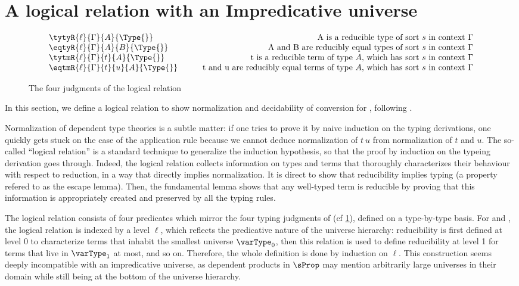 \section{A logical relation with an Impredicative universe}
\label{sec:logic-relat-with}

\begin{figure}
    \[
  \begin{array}{lr}
    \tytyR{\ell}{\Gamma}{A}{\Type{}} & \text{A is a reducible type of sort \( s \) in context \( \Gamma \)} \\
    \eqtyR{\ell}{\Gamma}{A}{B}{\Type{}} & \text{A and B are reducibly equal types of sort \( s \) in context \( \Gamma \)} \\
    \tytmR{\ell}{\Gamma}{t}{A}{\Type{}} & \text{t is a reducible term of type \( A \), which has sort \( s \) in context \( \Gamma \)} \\
    \eqtmR{\ell}{\Gamma}{t}{u}{A}{\Type{}} & \qquad\text{t and u are reducibly equal terms of type \( A \), which has sort \( s \) in context \( \Gamma \)}
  \end{array}
\]
  \caption{The four judgments of the logical relation}
  \label{fig:log-rel-judgments}
\end{figure}



In this section, we define a logical relation to show
normalization and decidability of conversion for \SetoidCC, following
.

Normalization of dependent type theories is a subtle matter:
if one tries to prove it by naive induction on the typing derivations,
one quickly gets stuck on the case of the application rule because
we cannot deduce normalization of \( t~u \) from normalization of
$t$ and $u$.
%
The so-called ``logical relation'' is a standard technique to generalize the
induction hypothesis, so that the proof by induction on the typeing
derivation goes through.
%
Indeed, the logical relation collects information on types and terms
that thoroughly characterizes their behaviour with respect to
reduction, in a way that directly implies normalization.
%
It is direct to show that reducibility implies typing (a property
refered to as the escape lemma).
%
Then, the fundamental lemma shows that any well-typed term is
reducible by proving that this information is appropriately created
and preserved by all the typing rules.

The logical relation consists of four predicates which mirror the four
typing judgments of \SetoidCC (cf \cref{fig:log-rel-judgments}), defined on a type-by-type basis.
%
%
For \MLTT and \SetoidTT, the logical relation is indexed by a level
\( \ell \), which reflects the predicative nature of the universe
hierarchy: reducibility is first defined at level $0$ to characterize
terms that inhabit the smallest universe \( \varType_0 \), then this relation is used
to define reducibility at level 1 for terms that live in
\( \varType_1 \) at most, and so on. Therefore, the whole definition is
done by induction on \( \ell \).
%
This construction seems deeply incompatible with an impredicative
universe, as dependent products in \( \sProp \) may mention arbitrarily
large universes in their domain while still being at the bottom
of the universe hierarchy.

